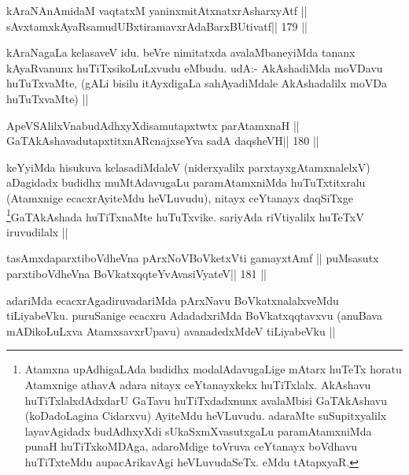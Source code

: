 
\begin{shl}
kAraNAnAmidaM vaqtatxM yaninxmitAtxnatxrAsharxyAtf ||
sAvxtamxkAyaRsamudUBxtiramavxrAdaBarxBUtivatf\hfill || 179 ||
\end{shl}

\begin{artha}
kAraNagaLa kelasaveV idu. beVre nimitatxda avalaMbaneyiMda tananx 
kAyaRvanunx huTiTxsikoLuLxvudu eMbudu. udA:- AkAshadiMda moVDavu 
huTuTxvaMte, (gALi bisilu itAyxdigaLa sahAyadiMdale AkAshadalilx moVDa huTuTxvaMte) ||
\end{artha}


\begin{shl}
ApeVSAlilxVnabudAdhxyXdisamutapxtwtx parAtamxnaH ||
GaTAkAshavadutapxtitxnARcnajxseYva sadA daqsheVH\hfill || 180 ||
\end{shl}

\begin{artha}
keYyiMda hisukuva kelasadiMdaleV (niderxyalilx parxtayxgAtamxnalelxV) 
aDagidadx budidhx muMtAdavugaLu paramAtamxniMda huTuTxtitxralu 
(Atamxnige ecacxrAyiteMdu heVLuvudu), nitayx ceYtanayx daqSiTxge 
\footnote[13]{Atamxna upAdhigaLAda budidhx modalAdavugaLige mAtarx 
huTeTx horatu Atamxnige athavA adara nitayx ceYtanayxkekx huTiTxlalx. 
AkAshavu huTiTxlalxdAdxdarU GaTavu huTiTxdadxnunx avalaMbisi 
GaTAkAshavu (koDadoLagina Cidarxvu) AyiteMdu heVLuvudu. adaraMte suSupitxyalilx layavAgidadx budAdhxyXdi sUkaSxmXvasutxgaLu paramAtamxniMda punaH huTiTxkoMDAga, adaroMdige toVruva ceYtanayx boVdhavu huTiTxteMdu aupacArikavAgi heVLuvudaSeTx. eMdu tAtapxyaR.}GaTAkAshada huTiTxnaMte huTuTxvike. sariyAda riVtiyalilx huTeTxV iruvudilalx ||
\end{artha}


\begin{shl}
tasAmxdaparxtiboVdheVna pArxNoV\s BoVketxVti gamayxtAmf ||
puMsasutx parxtiboVdheVna BoVkatxqqteYvAvasiVyateV\hfill || 181 ||
\end{shl}

\begin{artha}
adariMda ecacxrAgadiruvadariMda pArxNavu BoVkatxnalalxveMdu 
tiLiyabeVku. puruSanige ecacxru AdadadxriMda BoVkatxqqtavxvu (anuBava mADikoLuLxva AtamxsavxrUpavu) avanadedxMdeV tiLiyabeVku ||
\end{artha}

